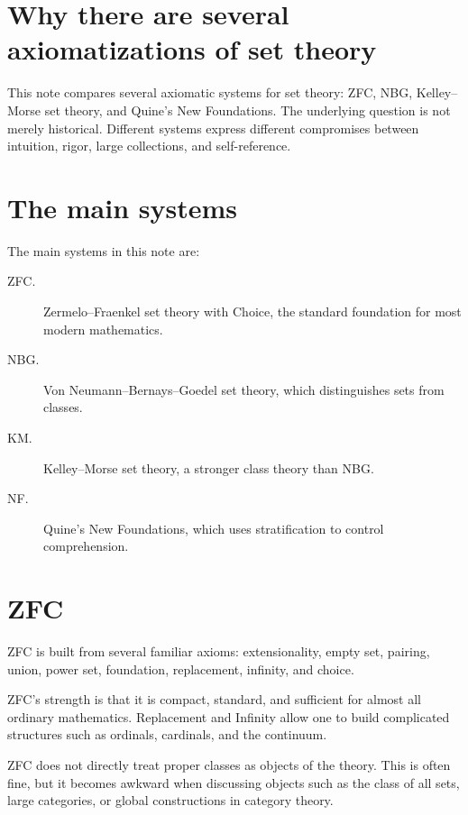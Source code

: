 
\section{Why there are several axiomatizations of set theory}

This note compares several axiomatic systems for set theory: ZFC, NBG, Kelley--Morse set theory, and Quine's New Foundations.  The underlying question is not merely historical.  Different systems express different compromises between intuition, rigor, large collections, and self-reference.

\section{The main systems}

The main systems in this note are:
\begin{description}
  \item[ZFC.] Zermelo--Fraenkel set theory with Choice, the standard foundation for most modern mathematics.
  \item[NBG.] Von Neumann--Bernays--Goedel set theory, which distinguishes sets from classes.
  \item[KM.] Kelley--Morse set theory, a stronger class theory than NBG.
  \item[NF.] Quine's New Foundations, which uses stratification to control comprehension.
\end{description}

\section{ZFC}

ZFC is built from several familiar axioms: extensionality, empty set, pairing, union, power set, foundation, replacement, infinity, and choice.

\begin{remark}
ZFC's strength is that it is compact, standard, and sufficient for almost all ordinary mathematics.  Replacement and Infinity allow one to build complicated structures such as ordinals, cardinals, and the continuum.
\end{remark}

\begin{caution}
ZFC does not directly treat proper classes as objects of the theory.  This is often fine, but it becomes awkward when discussing objects such as the class of all sets, large categories, or global constructions in category theory.
\end{caution}

